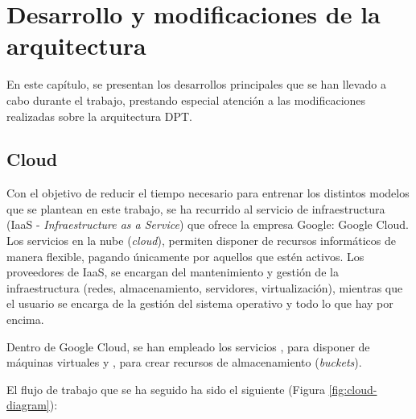 \section{Desarrollo y modificaciones de la arquitectura}

En este capítulo, se presentan los desarrollos principales que se han llevado a cabo durante el trabajo, prestando especial atención a las modificaciones realizadas sobre la arquitectura DPT.

\subsection{Cloud} 

Con el objetivo de reducir el tiempo necesario para entrenar los distintos modelos que se plantean en este trabajo, se ha recurrido al servicio de infraestructura (IaaS - \textit{Infraestructure as a Service}) que ofrece la empresa Google: Google Cloud. Los servicios en la nube (\textit{cloud}), permiten disponer de recursos informáticos de manera flexible, pagando únicamente por aquellos que estén activos. Los proveedores de IaaS, se encargan del mantenimiento y gestión de la infraestructura (redes, almacenamiento, servidores, virtualización), mientras que el usuario se encarga de la gestión del sistema operativo y todo lo que hay por encima. 

Dentro de Google Cloud, se han empleado los servicios , para disponer de máquinas virtuales y , para crear recursos de almacenamiento (\textit{buckets}).

El flujo de trabajo que se ha seguido ha sido el siguiente (Figura \ref{fig:cloud-diagram}):

